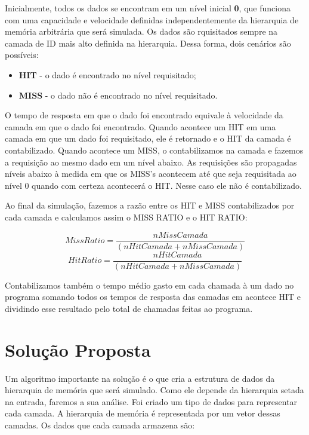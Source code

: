 \documentclass[12pt]{article}
\begin{document}
Inicialmente, todos os dados se encontram em um nível inicial \textbf{0}, que funciona com uma capacidade e velocidade definidas independentemente da hierarquia de memória arbitrária que será simulada. Os dados são rquisitados sempre na camada de ID mais alto definida na hierarquia. Dessa forma, dois cenários são possíveis:

\begin{itemize}
  \item \textbf{HIT} - o dado é encontrado no nível requisitado;
  \item \textbf{MISS} - o dado não é encontrado no nível requisitado.
\end{itemize}

O tempo de resposta em que o dado foi encontrado equivale à velocidade da camada em que o dado foi encontrado. Quando acontece um HIT em uma camada em que um dado foi requisitado, ele é retornado e o HIT da camada é contabilizado. Quando acontece um MISS, o contabilizamos na camada e fazemos a requisição ao mesmo dado em um nível abaixo. As requisições são propagadas níveis abaixo à medida em que os MISS's acontecem até que seja requisitada ao nível 0 quando com certeza acontecerá o HIT. Nesse caso ele não é contabilizado.

Ao final da simulação, fazemos a razão entre os HIT e MISS contabilizados por cada camada e calculamos assim o MISS RATIO 
e o HIT RATIO:
\begin{center}
\[MissRatio = \frac{nMissCamada}{(nHitCamada + nMissCamada)}\]
\[HitRatio = \frac{nHitCamada}{(nHitCamada + nMissCamada)}\]
\end{center}

Contabilizamos também o tempo médio gasto em cada chamada à um dado no programa somando todos os tempos de resposta das camadas em acontece HIT e dividindo esse resultado pelo total de chamadas feitas ao programa.

\section{Solução Proposta}
\label{solucao_proposta}

Um algoritmo importante na solução é o que cria a estrutura de dados da hierarquia de memória que será simulado. Como ele depende da hierarquia setada na entrada, faremos a sua análise. Foi criado um tipo de dados para representar cada camada. A hierarquia de memória é representada por um vetor dessas camadas. Os dados que cada camada armazena são:
\end{document}
